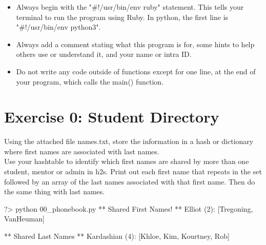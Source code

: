 \documentclass{42-en}
\begin{document}
\begin{itemize}
	\item Always begin with the "\#!/usr/bin/env ruby" statement. This tells your terminal to run the program using Ruby. In python, the first line is "\#!/usr/bin/env python3".
	\item Always add a comment stating what this program is for, some hints to help others use or understand it, and your name or intra ID.
	\item Do not write any code outside of functions except for one line, at the end of your program, which calls the main() function.
\end{itemize}

\startexercices


\chapter{Exercise 0: Student Directory}
\makeheaderfiles

Using the attached file names.txt, store the information in a hash or dictionary where first names are associated with last names.\\

Use your hashtable to identify which first names are shared by more than one student, mentor or admin in h2s. Print out each first name that repeats in the set followed by an array of the last names associated with that first name. Then do the same thing with last names.

\begin{42console}
	?> python 00_phonebook.py
	** Shared First Names! **
	Elliot (2): [Tregoning, VanHeuman]

	** Shared Last Names **
	Kardashian (4): [Khloe, Kim, Kourtney, Rob]
\end{42console}
\end{document}
